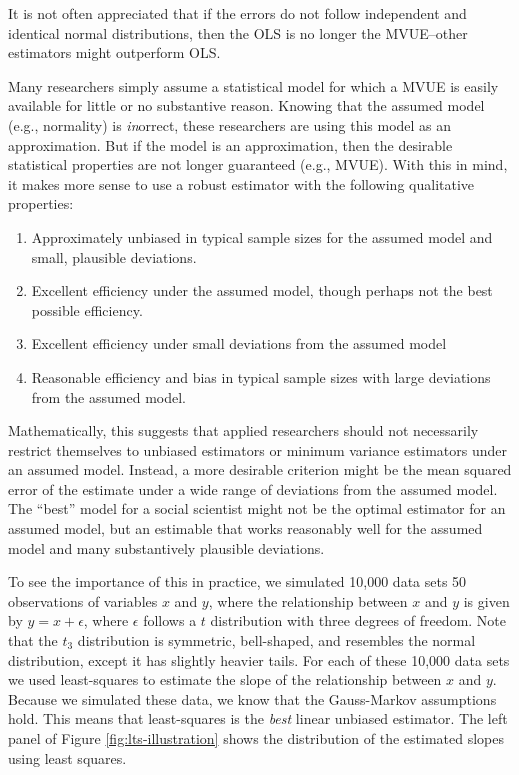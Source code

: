 \documentclass[12pt]{article}
\begin{document}
It is not often appreciated that if the errors do not follow independent and identical normal distributions, then the OLS is no longer the MVUE--other estimators might outperform OLS.

Many researchers simply assume a statistical model for which a MVUE is easily available for little or no substantive reason. Knowing that the assumed model (e.g., normality) is \textit{in}orrect, these researchers are using this model as an approximation. But if the model is an approximation, then the desirable statistical properties are not longer guaranteed (e.g., MVUE). With this in mind, it makes more sense to use a robust estimator with the following qualitative properties:
\begin{enumerate}
\item Approximately unbiased in typical sample sizes for the assumed model and small, plausible deviations.
\item Excellent efficiency under the assumed model, though perhaps not the best possible efficiency.
\item Excellent efficiency under small deviations from the assumed model
\item Reasonable efficiency and bias in typical sample sizes with large deviations from the assumed model. 
\end{enumerate}

Mathematically, this suggests that applied researchers should not necessarily restrict themselves to unbiased estimators or minimum variance estimators under an assumed model. Instead, a more desirable criterion might be the mean squared error of the estimate under a wide range of deviations from the assumed model. The ``best'' model for a social scientist might not be the optimal estimator for an assumed model, but an estimable that works reasonably well for the assumed model and many substantively plausible deviations. 

To see the importance of this in practice, we simulated 10,000 data sets 50 observations of variables $x$ and $y$, where the relationship between $x$ and $y$ is given by $y = x + \epsilon$, where $\epsilon$ follows a $t$ distribution with three degrees of freedom. Note that the $t_3$ distribution is symmetric, bell-shaped, and resembles the normal distribution, except it has slightly heavier tails. For each of these 10,000 data sets we used least-squares to estimate the slope of the relationship between $x$ and $y$. Because we simulated these data, we know that the Gauss-Markov assumptions hold. This means that least-squares is the \textit{best} linear unbiased estimator. The left panel of Figure \ref{fig:lts-illustration} shows the distribution of the estimated slopes using least squares.
\end{document}

